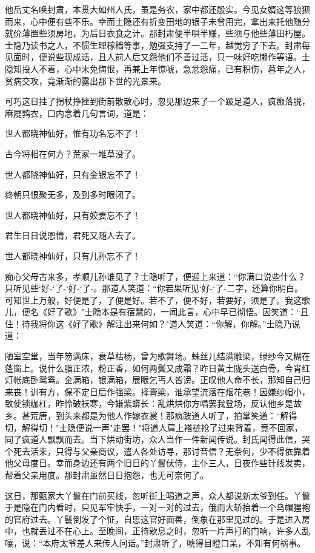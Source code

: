 他岳丈名唤封肃，本贯大如州人氏，虽是务农，家中都还殷实。今见女婿这等狼狈而来，心中便有些不乐。幸而士隐还有折变田地的银子未曾用完，拿出来托他随分就价薄置些须房地，为后日衣食之计。那封肃便半哄半赚，些须与他些薄田朽屋。士隐乃读书之人，不惯生理稼穑等事，勉强支持了一二年，越觉穷了下去。封肃每见面时，便说些现成话，且人前人后又怨他们不善过活，只一味好吃懒作等语。士隐知投人不着，心中未免悔恨，再兼上年惊唬，急忿怨痛，已有积伤，暮年之人，贫病交攻，竟渐渐的露出那下世的光景来。

可巧这日拄了拐杖挣挫到街前散散心时，忽见那边来了一个跛足道人，疯癫落脱，麻屣鹑衣，口内念着几句言词，道是：

世人都晓神仙好，惟有功名忘不了！

古今将相在何方？荒冢一堆草没了。

世人都晓神仙好，只有金银忘不了！

终朝只恨聚无多，及到多时眼闭了。

世人都晓神仙好，只有姣妻忘不了！

君生日日说恩情，君死又随人去了。

世人都晓神仙好，只有儿孙忘不了！

痴心父母古来多，孝顺儿孙谁见了？士隐听了，便迎上来道：“你满口说些什么？只听见些`好-`了-`好-`了-。那道人笑道：“你若果听见`好-`了-二字，还算你明白。可知世上万般，好便是了，了便是好。若不了，便不好，若要好，须是了。我这歌儿，便名《好了歌》"士隐本是有宿慧的，一闻此言，心中早已彻悟。因笑道：“且住！待我将你这《好了歌》解注出来何如？"道人笑道：“你解，你解。”士隐乃说道：

陋室空堂，当年笏满床，衰草枯杨，曾为歌舞场。蛛丝儿结满雕梁，绿纱今又糊在蓬窗上。说什么脂正浓，粉正香，如何两鬓又成霜？昨日黄土陇头送白骨，今宵红灯帐底卧鸳鸯。金满箱，银满箱，展眼乞丐人皆谤。正叹他人命不长，那知自己归来丧！训有方，保不定日后作强梁。择膏粱，谁承望流落在烟花巷！因嫌纱帽小，致使锁枷杠，昨怜破袄寒，今嫌紫蟒长：乱烘烘你方唱罢我登场，反认他乡是故乡。甚荒唐，到头来都是为他人作嫁衣裳！那疯跛道人听了，拍掌笑道：“解得切，解得切！"士隐便说一声"走罢！"将道人肩上褡裢抢了过来背着，竟不回家，同了疯道人飘飘而去。当下烘动街坊，众人当作一件新闻传说。封氏闻得此信，哭个死去活来，只得与父亲商议，遣人各处访寻，那讨音信？无奈何，少不得依靠着他父母度日。幸而身边还有两个旧日的丫鬟伏侍，主仆三人，日夜作些针线发卖，帮着父亲用度。那封肃虽然日日抱怨，也无可奈何了。

这日，那甄家大丫鬟在门前买线，忽听街上喝道之声，众人都说新太爷到任。丫鬟于是隐在门内看时，只见军牢快手，一对一对的过去，俄而大轿抬着一个乌帽猩袍的官府过去。丫鬟倒发了个怔，自思这官好面善，倒象在那里见过的。于是进入房中，也就丢过不在心上。至晚间，正待歇息之时，忽听一片声打的门响，许多人乱嚷，说：“本府太爷差人来传人问话。”封肃听了，唬得目瞪口呆，不知有何祸事。

